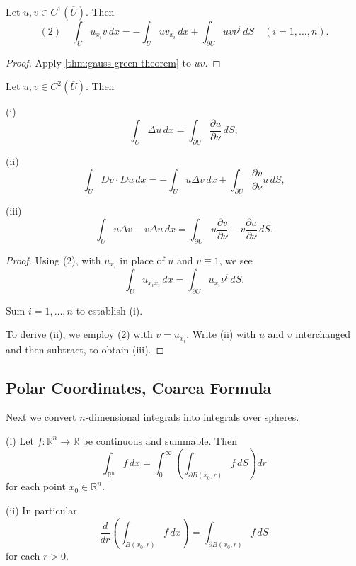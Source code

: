 \begin{theorem}
\label{thm:integration-by-parts-formula}
Let $u, v \in C^1(\overline{U})$. Then
$$(2) \quad \int_U u_{x_i} v \, dx = -\int_U u v_{x_i} \, dx + \int_{\partial U} u v \nu^i \, dS \quad (i = 1, \ldots, n).$$
\end{theorem}

\begin{proof}
Apply \cref{thm:gauss-green-theorem} to $uv$.
\end{proof}

\begin{theorem}
\label{thm:greens-formulas}
Let $u, v \in C^2(\overline{U})$. Then

(i) $$\int_U \Delta u \, dx = \int_{\partial U} \frac{\partial u}{\partial \nu} \, dS,$$

(ii) $$\int_U Dv \cdot Du \, dx = -\int_U u \Delta v \, dx + \int_{\partial U} \frac{\partial v}{\partial \nu} u \, dS,$$

(iii) $$\int_U u \Delta v - v \Delta u \, dx = \int_{\partial U} u \frac{\partial v}{\partial \nu} - v \frac{\partial u}{\partial \nu} \, dS.$$
\end{theorem}

\begin{proof}
Using (2), with $u_{x_i}$ in place of $u$ and $v \equiv 1$, we see
$$\int_U u_{x_i x_i} \, dx = \int_{\partial U} u_{x_i} \nu^i \, dS.$$

Sum $i = 1, \ldots, n$ to establish (i).

To derive (ii), we employ (2) with $v = u_{x_i}$. Write (ii) with $u$ and $v$ interchanged and then subtract, to obtain (iii).
\end{proof}

\subsection{Polar Coordinates, Coarea Formula}

Next we convert $n$-dimensional integrals into integrals over spheres.

\begin{theorem}
\label{thm:polar-coordinates}
(i) Let $f : \mathbb{R}^n \to \mathbb{R}$ be continuous and summable. Then
$$\int_{\mathbb{R}^n} f \, dx = \int_0^\infty \left( \int_{\partial B(x_0, r)} f \, dS \right) dr$$
for each point $x_0 \in \mathbb{R}^n$.

(ii) In particular
$$\frac{d}{dr} \left( \int_{B(x_0, r)} f \, dx \right) = \int_{\partial B(x_0, r)} f \, dS$$
for each $r > 0$.
\end{theorem}

